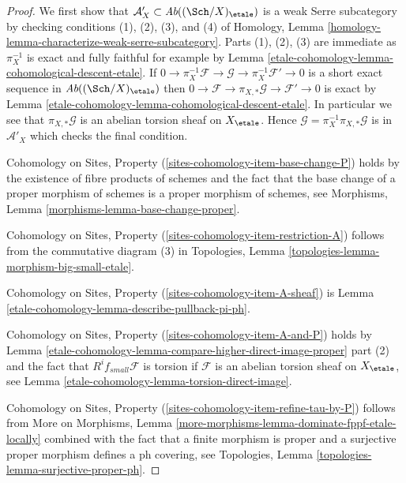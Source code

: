\begin{proof}
We first show that $\mathcal{A}'_X \subset \textit{Ab}((\Sch/X)_\etale)$
is a weak Serre subcategory by checking conditions (1), (2), (3), and (4)
of Homology, Lemma \ref{homology-lemma-characterize-weak-serre-subcategory}.
Parts (1), (2), (3) are immediate as $\pi_X^{-1}$ is exact and
fully faithful for example by Lemma \ref{etale-cohomology-lemma-cohomological-descent-etale}. If
$0 \to \pi_X^{-1}\mathcal{F} \to \mathcal{G} \to \pi_X^{-1}\mathcal{F}' \to 0$
is a short exact sequence in $\textit{Ab}((\Sch/X)_\etale)$
then $0 \to \mathcal{F} \to \pi_{X, *}\mathcal{G} \to \mathcal{F}' \to 0$
is exact by Lemma \ref{etale-cohomology-lemma-cohomological-descent-etale}.
In particular we see that $\pi_{X, *}\mathcal{G}$ is an abelian
torsion sheaf on $X_\etale$.
Hence $\mathcal{G} = \pi_X^{-1}\pi_{X, *}\mathcal{G}$ is in
$\mathcal{A}'_X$ which checks the final condition.

\medskip\noindent
Cohomology on Sites, Property (\ref{sites-cohomology-item-base-change-P}) holds
by the existence of fibre products of schemes
and the fact that the base change of a proper morphism of
schemes is a proper morphism of schemes, see
Morphisms, Lemma \ref{morphisms-lemma-base-change-proper}.

\medskip\noindent
Cohomology on Sites, Property (\ref{sites-cohomology-item-restriction-A})
follows from the commutative diagram (3) in
Topologies, Lemma \ref{topologies-lemma-morphism-big-small-etale}.

\medskip\noindent
Cohomology on Sites, Property (\ref{sites-cohomology-item-A-sheaf}) is
Lemma \ref{etale-cohomology-lemma-describe-pullback-pi-ph}.

\medskip\noindent
Cohomology on Sites, Property (\ref{sites-cohomology-item-A-and-P}) holds by
Lemma \ref{etale-cohomology-lemma-compare-higher-direct-image-proper} part (2)
and the fact that $R^if_{small}\mathcal{F}$
is torsion if $\mathcal{F}$ is an abelian torsion
sheaf on $X_\etale$, see Lemma \ref{etale-cohomology-lemma-torsion-direct-image}.

\medskip\noindent
Cohomology on Sites, Property (\ref{sites-cohomology-item-refine-tau-by-P})
follows from More on Morphisms, Lemma
\ref{more-morphisms-lemma-dominate-fppf-etale-locally}
combined with the fact that a finite morphism is proper
and a surjective proper morphism defines a ph covering, see
Topologies, Lemma \ref{topologies-lemma-surjective-proper-ph}.
\end{proof}

